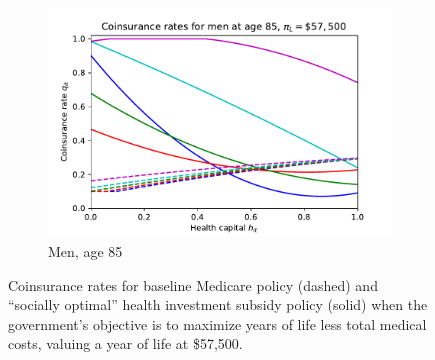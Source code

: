 \documentclass[12pt,pdftex,letterpaper]{article}
\begin{document}
\begin{figure}[h!]
\begin{subfigure}[b]{0.49\textwidth}
        \includegraphics[width=\textwidth]{../Figures/SocOpt57CopayMen85.pdf}
        \caption{Men, age 85}
    \end{subfigure}
    \caption{Coinsurance rates for baseline Medicare policy (dashed) and ``socially optimal'' health investment subsidy policy (solid) when the government's objective is to maximize years of life less total medical costs, valuing a year of life at \$57,500.}
    \label{fig:SocOpt57Copay}
\end{figure}


\clearpage
\end{document}
